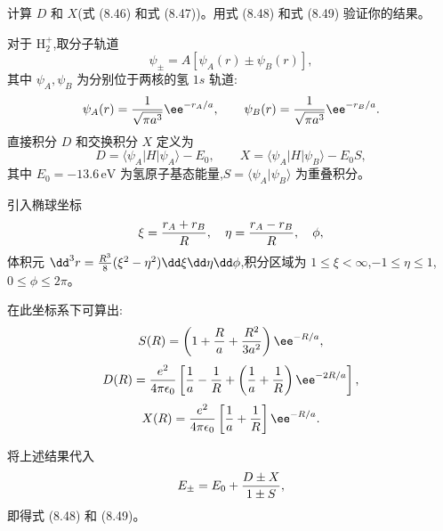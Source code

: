 \begin{question}
计算 $D$ 和 $X$(式 (8.46) 和式 (8.47))。用式 (8.48) 和式 (8.49) 验证你的结果。

\par\smallskip
{}

\end{question}
\begin{solution}
对于 $\mathrm H_2^+$,取分子轨道
\[
\psi_\pm=A[\psi_A(r)\pm\psi_B(r)],
\]
其中 $\psi_A,\psi_B$ 为分别位于两核的氢 $1s$ 轨道:
\[
\psi_A(r)={1\over\sqrt{\pi a^3}}\ee^{-r_A/a},\qquad
\psi_B(r)={1\over\sqrt{\pi a^3}}\ee^{-r_B/a}.
\]
直接积分 $D$ 和交换积分 $X$ 定义为
\[
D=\langle\psi_A|H|\psi_A\rangle-E_0,\qquad
X=\langle\psi_A|H|\psi_B\rangle-E_0S,
\]
其中 $E_0=-13.6\,\mathrm{eV}$ 为氢原子基态能量,$S=\langle\psi_A|\psi_B\rangle$ 为重叠积分。

引入椭球坐标
\[
\xi={r_A+r_B\over R},\quad \eta={r_A-r_B\over R},\quad \phi,
\]
体积元 $\dd^3r={R^3\over8}(\xi^2-\eta^2)\dd\xi\dd\eta\dd\phi$,积分区域为 $1\le\xi<\infty$,$-1\le\eta\le1$,$0\le\phi\le2\pi$。

在此坐标系下可算出:
\[
S(R)=\left(1+{R\over a}+{R^2\over3a^2}\right)\ee^{-R/a},
\]
\[
D(R)={e^2\over4\pi\epsilon_0}\left[{1\over a}-{1\over R}+\left({1\over a}+{1\over R}\right)\ee^{-2R/a}\right],
\]
\[
X(R)={e^2\over4\pi\epsilon_0}\left[{1\over a}+{1\over R}\right]\ee^{-R/a}.
\]

将上述结果代入
\[
E_\pm=E_0+{D\pm X\over1\pm S},
\]
即得式 (8.48) 和 (8.49)。
\end{solution}

